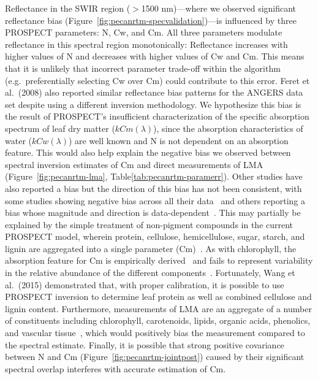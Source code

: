 Reflectance in the SWIR region ($>$1500 nm)---where we observed significant reflectance bias (Figure~\ref{fig:pecanrtm-specvalidation})---is influenced by three PROSPECT parameters: N, Cw, and Cm.
All three parameters modulate reflectance in this spectral region monotonically: 
Reflectance increases with higher values of N and decreases with higher values of Cw and Cm.
This means that it is unlikely that incorrect parameter trade-off within the algorithm (e.g.\ preferentially selecting Cw over Cm) could contribute to this error.
Feret et al.~(2008) also reported similar reflectance bias patterns for the ANGERS data set despite using a different inversion methodology. \nocite{feret_2008_prospect}
We hypothesize this bias is the result of PROSPECT’s insufficient characterization of the specific absorption spectrum of leaf dry matter ($kCm(\lambda)$),
since the absorption characteristics of water ($kCw(\lambda)$) are well known and N is not dependent on an absorption feature.
This would also help explain the negative bias we observed between spectral inversion estimates of Cm and direct measurements of LMA (Figure~\ref{fig:pecanrtm-lma}, Table\ref{tab:pecanrtm-paramerr}).
Other studies have also reported a bias but the direction of this bias has not been consistent, with some studies showing negative bias across all their data~\cite{li_2011_retrieval,cheng_2014_deriving} and others reporting a bias whose magnitude and direction is data-dependent~\cite{feret_2008_prospect}.
This may partially be explained by the simple treatment of non-pigment compounds in the current PROSPECT model, wherein protein, cellulose, hemicellulose, sugar, starch, and lignin are aggregated into a single parameter (Cm)~\cite{fourty_1996_leaf}.
As with chlorophyll, the absorption feature for Cm is empirically derived~\cite{feret_2008_prospect} and fails to represent variability in the relative abundance of the different components~\cite{poorter_2009_causes}.
Fortunately, Wang et al.~(2015) demonstrated that, with proper calibration, it is possible to use PROSPECT inversion to determine leaf protein as well as combined cellulose and lignin content. \nocite{wang_2015_applicability}
Furthermore, measurements of LMA are an aggregate of a number of constituents including chlorophyll, carotenoids, lipids, organic acids, phenolics, and vascular tissue~\cite{poorter_2009_causes}, which would positively bias the measurement compared to the spectral estimate.
Finally, it is possible that strong positive covariance between N and Cm (Figure~\ref{fig:pecanrtm-jointpost}) caused by their significant spectral overlap interferes with accurate estimation of Cm.
